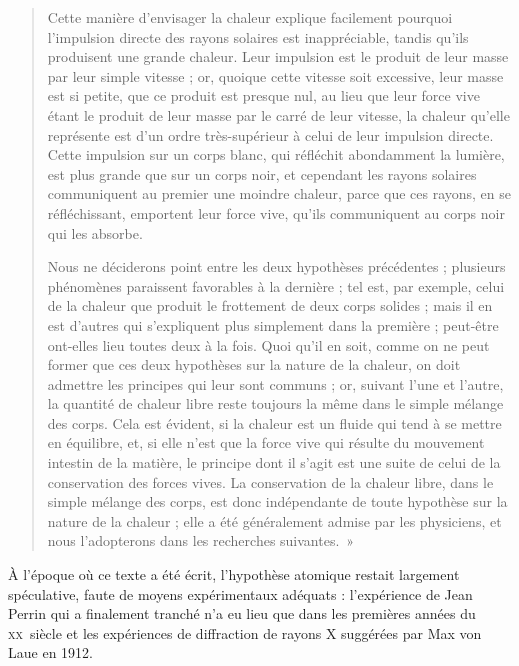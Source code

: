 \begin{quote}
	Cette manière d’envisager la chaleur explique facilement pourquoi l’impulsion directe des rayons solaires est inappréciable, tandis qu’ils produisent une grande chaleur. Leur impulsion est le produit de leur masse par leur simple vitesse ; or, quoique cette vitesse soit excessive, leur masse est si petite, que ce produit est presque nul, au lieu que leur force vive étant le produit de leur masse par le carré de leur vitesse, la chaleur qu’elle représente est d’un ordre très-supérieur à celui de leur impulsion directe. Cette impulsion sur un corps blanc, qui réfléchit abondamment la lumière, est plus grande que sur un corps noir, et cependant les rayons solaires communiquent au premier une moindre chaleur, parce que ces rayons, en se réfléchissant, emportent leur force vive, qu’ils communiquent au corps noir qui les absorbe. 

	Nous ne déciderons point entre les deux hypothèses précédentes ; plusieurs phénomènes paraissent favorables à la dernière ; tel est, par exemple, celui de la chaleur que produit le frottement de deux corps solides ; mais il en est d’autres qui s’expliquent plus simplement dans la première ; peut-être ont-elles lieu toutes deux à la fois. Quoi qu’il en soit, comme on ne peut former que ces deux hypothèses sur la nature de la chaleur, on doit admettre les principes qui leur sont communs ; or, suivant l’une et l’autre, la quantité de chaleur libre reste toujours la même dans le simple mélange des corps. Cela est évident, si la chaleur est un fluide qui tend à se mettre en équilibre, et, si elle n’est que la force vive qui résulte du mouvement intestin de la matière, le principe dont il s’agit est une suite de celui de la conservation des forces vives. La conservation de la chaleur libre, dans le simple mélange des corps, est donc indépendante de toute hypothèse sur la nature de la chaleur ; elle a été généralement admise par les physiciens, et nous l’adopterons dans les recherches suivantes.~» \end{quote} 

	À l'époque où ce texte a été écrit, l'hypothèse atomique restait largement spéculative, faute de moyens expérimentaux adéquats : l'expérience de Jean Perrin qui a finalement tranché n'a eu lieu que dans les premières années du \textsc{xx}\ieme\ siècle et les expériences de diffraction de rayons X suggérées par Max von Laue en 1912. 

\atendofhistorysection

